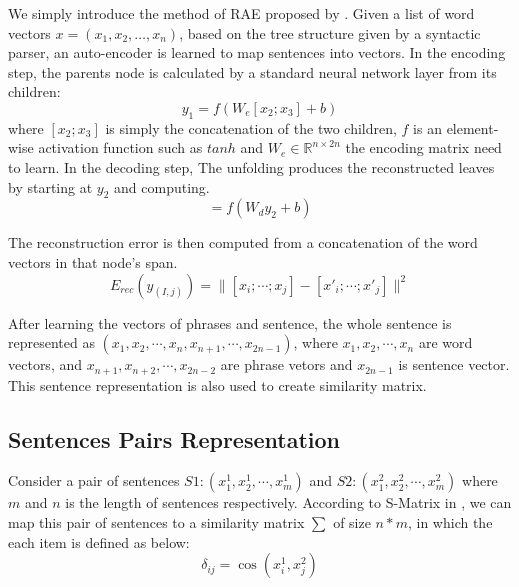 \documentclass[conference]{IEEEtran}
\begin{document}
We simply introduce the method of RAE proposed by \cite{DBLP:conf/naacl/YinS15}. Given a list of word vectors $x=(x_1,x_2,\ldots,x_n)$, based on the tree structure given by a syntactic parser, an auto-encoder is learned to map sentences into vectors. In the encoding step, the parents node is calculated by a standard neural network layer from its children:
\begin{equation}
y_1=f(W_e [x_2;x_3]+b)
\end{equation}
where $[x_2;x_3]$ is simply the concatenation of the two children, $f$ is an element-wise activation function such as $\mathit{tanh}$ and $W_e \in \mathbb{R}^{n \times 2n}$ the encoding matrix need to learn. In the decoding step, The unfolding produces the reconstructed leaves by starting at $y_2$ and computing.
\begin{equation}
[x’_1;y’_1]=f(W_d y_2 +b)
\end{equation}

The reconstruction error is then computed from a concatenation of the word vectors in that node's span.
\begin{equation}
E_{rec}(y_{(I,j)})=\|[x_i;\cdots; x_j]- [x'_i;\cdots ;x'_j]\|^2
\end{equation}

After learning the vectors of phrases and sentence, the whole sentence is represented as $(x_1,x_2,\cdots,x_n,x_{n+1},\cdots,x_{2n-1})$, where $ x_1,x_2,\cdots,x_n $ are word vectors, and $x_{n+1},x_{n+2},\cdots,x_{2n-2}$ are phrase vetors and $x_{2n-1}$ is sentence vector. This sentence representation is also used to create similarity matrix.

\subsection{Sentences Pairs Representation}
Consider a pair of sentences $ S1:(x_1^1,x_2^1,\cdots,x_m^1) $ and $ S2:(x_1^2,x_2^2,\cdots,x_m^2 )$ where $m$ and $n$ is the length of sentences respectively. According to S-Matrix in \cite{DBLP:conf/aaai/ShenRSOX15}, we can map this pair of sentences to a similarity matrix $\sum$ of size $n*m$, in which the each item is defined as below:
\begin{equation}
\delta_{ij}=\cos (x_i^1,x_j^2)
\end{equation}
\end{document}
